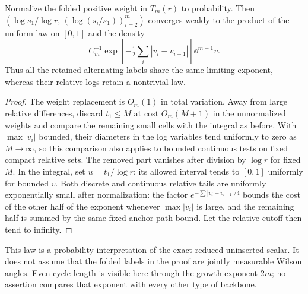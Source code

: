 \begin{corollary}\label{cor:law}
Normalize the folded positive weight in \(T_m(r)\) to probability.
Then \((\log s_1/\log r,\,(\log(s_i/s_1))_{i=2}^m)\) converges
weakly to the product of the uniform law on \([0,1]\) and the density
\[
 C_m^{-1}\exp\!\left[-\tfrac12\sum_i|v_i-v_{i+1}|\right]\dd^{m-1}v.
\]
Thus all the retained alternating labels share the same limiting
exponent, whereas their relative logs retain a nontrivial law.
\end{corollary}
\begin{proof}
The weight replacement is \(O_m(1)\) in total variation. Away from
large relative differences, discard \(t_1\le M\) at cost \(O_m(M+1)\)
in the unnormalized weights and compare the remaining small cells
with the integral as before. With \(\max|v_i|\) bounded, their
diameters in the log variables tend uniformly to zero as
\(M\to\infty\), so this comparison also applies to bounded continuous
tests on fixed compact relative sets. The removed part vanishes
after division by \(\log r\) for fixed \(M\).
In the integral, set \(u=t_1/\log r\); its allowed interval tends to
\([0,1]\) uniformly for bounded \(v\).
Both discrete and continuous relative tails are uniformly
exponentially small after normalization: the factor
\(e^{-\sum|v_i-v_{i+1}|/4}\) bounds the cost of the other half of
the exponent whenever \(\max|v_i|\) is large, and the remaining
half is summed by the same fixed-anchor path bound. Let the
relative cutoff then tend to infinity.
\end{proof}

This law is a probability interpretation of the exact reduced
uninserted scalar. It does not assume that the folded labels in the
proof are jointly measurable Wilson angles. Even-cycle length is
visible here through the growth exponent \(2m\); no assertion compares
that exponent with every other type of backbone.
